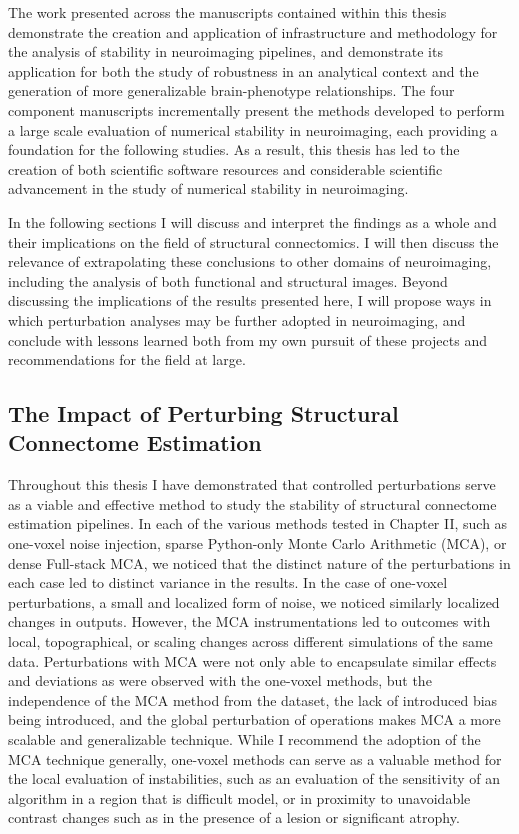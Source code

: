 The work presented across the manuscripts contained within this thesis demonstrate the creation and application of
infrastructure and methodology for the analysis of stability in neuroimaging pipelines, and demonstrate its
application for both the study of robustness in an analytical context and the generation of more generalizable
brain-phenotype relationships. The four component manuscripts incrementally present the methods developed to
perform a large scale evaluation of numerical stability in neuroimaging, each providing a foundation for the
following studies. As a result, this thesis has led to the creation of both scientific software resources and
considerable scientific advancement in the study of numerical stability in neuroimaging.

In the following sections I will discuss and interpret the findings as a whole and their implications on the field
of structural connectomics. I will then discuss the relevance of extrapolating these conclusions to other domains
of neuroimaging, including the analysis of both functional and structural images. Beyond discussing the
implications of the results presented here, I will propose ways in which perturbation analyses may be further
adopted in neuroimaging, and conclude with lessons learned both from my own pursuit of these projects and
recommendations for the field at large.

\subsection{The Impact of Perturbing Structural Connectome Estimation}

Throughout this thesis I have demonstrated that controlled perturbations serve as a viable and effective method
to study the stability of structural connectome estimation pipelines. In each of the various methods tested in
Chapter II, such as one-voxel noise injection, sparse Python-only Monte Carlo Arithmetic (MCA), or dense Full-stack
MCA, we noticed that the distinct nature of the perturbations in each case led to distinct variance in the results.
In the case of one-voxel perturbations, a small and localized form of noise, we noticed similarly localized changes
in outputs. However, the MCA instrumentations led to outcomes with local, topographical, or scaling changes across
different simulations of the same data. Perturbations with MCA were not only able to encapsulate similar effects
and deviations as were observed with the one-voxel methods, but the independence of the MCA method from the dataset,
the lack of introduced bias being introduced, and the global perturbation of operations makes MCA a more
scalable and generalizable technique. While I recommend the adoption of the MCA technique generally, one-voxel
methods can serve as a valuable method for the local evaluation of instabilities, such as an evaluation of the
sensitivity of an algorithm in a region that is difficult model, or in proximity to unavoidable contrast changes
such as in the presence of a lesion or significant atrophy.

